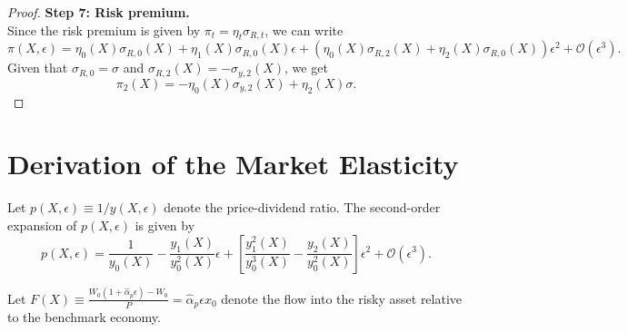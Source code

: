 \begin{proof}
\noindent\textbf{Step 7: Risk premium.}\\
Since the risk premium is given by $ \pi_t=\eta_t\sigma_{R,t} $, we can write
\begin{equation*}
\pi(X,\epsilon) = \eta_0(X)\sigma_{R,0}(X) + \eta_1(X)\sigma_{R,0}(X)\epsilon+
\left(\eta_{0}(X)\sigma_{R,2}(X)+\eta_2(X)\sigma_{R,0}(X)\right)\epsilon^2+\mathcal{O}\left (\epsilon^3\right).
\end{equation*}
Given that $ \sigma_{R,0}=\sigma $ and $ \sigma_{R,2}(X)=-\sigma_{y,2}(X) $, we get
\begin{equation}\label{eq:rp-second-order}
	\pi_2(X) = -\eta_{0}(X)\sigma_{y, 2}(X)+\eta_2(X)\sigma.
\end{equation}

\end{proof}

\section{Derivation of the Market Elasticity}

Let $p(X,\epsilon) \equiv 1/y(X,\epsilon)$ denote the price-dividend ratio. The second-order expansion of $p(X,\epsilon)$ is given by
\begin{equation}\label{eq:price-dividend}
    p(X,\epsilon) = \frac{1}{y_0(X)} - \frac{y_1(X)}{y_0^2(X)} \epsilon + \left[ \frac{y_1^2(X)}{y_0^3(X)} - \frac{y_{2}(X)}{y_0^2(X)} \right] \epsilon^2 + \mathcal{O}(\epsilon^3).
\end{equation}

Let $F(X) \equiv \frac{W_0 (1+\hat{\alpha}_p \epsilon) - W_0}{P} = \hat{\alpha}_p \epsilon x_0$ denote the flow into the risky asset relative to the benchmark economy. 

